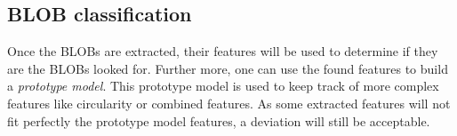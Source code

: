 
\subsection{BLOB classification}
Once the BLOBs are extracted, their features will be used to determine if they are the BLOBs looked for. Further more, one can use the found features to build a \textit{prototype model}. This prototype model is used to keep track of more complex features like circularity or combined features. As some extracted features will not fit perfectly the prototype model features, a deviation will still be acceptable.